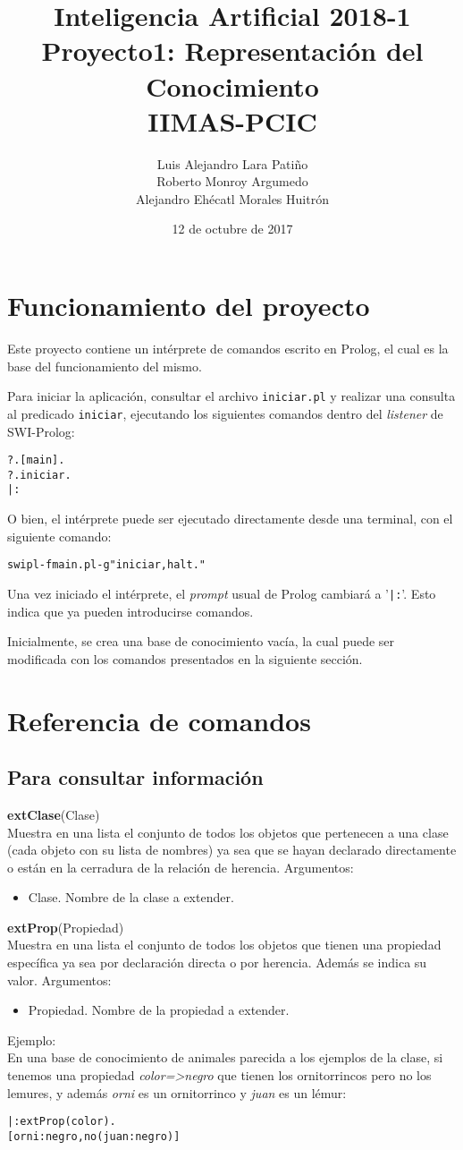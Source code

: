 \documentclass[11pt]{article}
\title{Inteligencia Artificial 2018-1 \\ Proyecto1: Representación del Conocimiento\\
\small{IIMAS-PCIC}}
\author{Luis Alejandro Lara Patiño\\Roberto Monroy Argumedo\\
Alejandro Ehécatl Morales Huitrón}
\date{12 de octubre de 2017}
\newcommand{\bt}{\begin{alltt}}
\newcommand{\et}{\end{alltt}}
\newcommand{\comando}[2]{
    \textbf{#1}(#2)\\
}
\newenvironment{args}{
    \newline
    Argumentos:
    \begin{itemize}
}{
    \end{itemize}
    \bigskip
}
\begin{document}
\maketitle

\tableofcontents

\section{Funcionamiento del proyecto}

Este proyecto contiene un intérprete de comandos escrito en Prolog, el cual es la base del funcionamiento del mismo.

Para iniciar la aplicación, consultar el archivo \texttt{iniciar.pl} y realizar una consulta al predicado \texttt{iniciar}, ejecutando los siguientes comandos dentro del \textit{listener} de SWI-Prolog:

\bt
?. [main].
?. iniciar.
|:
\et

O bien, el intérprete puede ser ejecutado directamente desde una terminal, con el siguiente comando:

\bt
swipl -f main.pl -g "iniciar, halt."
\et

Una vez iniciado el intérprete, el \textit{prompt} usual de Prolog cambiará a '\texttt{|:}'. Esto indica que ya pueden introducirse comandos.

Inicialmente, se crea una base de conocimiento vacía, la cual puede ser modificada con los comandos presentados en la siguiente sección.

\section{Referencia de comandos}

\subsection{Para consultar información}

\comando{extClase}{Clase}
Muestra en una lista el conjunto de todos los objetos que pertenecen a una clase (cada objeto con 
su lista de nombres) ya sea que se hayan declarado directamente o están en la cerradura de la relación de 
herencia.
\begin{args}
    \item Clase. Nombre de la clase a extender.
\end{args}

\comando{extProp}{Propiedad}
Muestra en una lista el conjunto de todos los objetos que tienen una propiedad específica ya sea
por declaración directa o por herencia. Además se indica su valor.
\begin{args}
    \item Propiedad. Nombre de la propiedad a extender.
\end{args}
Ejemplo:\\
En una base de conocimiento de animales parecida a los ejemplos de la clase, si tenemos una propiedad
\textit{color=>negro} que tienen los ornitorrincos pero no los lemures, y además \textit{orni} es un
ornitorrinco y \textit{juan} es un lémur:
\bt
|: extProp(color).
[orni:negro,no(juan:negro)]
\et
\end{document}

